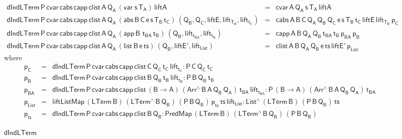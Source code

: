 \documentclass[sigplan,10pt]{acmart}
\begin{document}
\begin{figure*}[t]
\begin{adjustbox}{varwidth=7.3in, max width=7.1in, margin=-0.0in 0in
      -0.2in 0in, fbox, center}
{\small
\[\begin{array}{lll}
\mathsf{dIndLTerm \, P\, cvar \, cabs\, capp\, clist \, A\, Q_A\,
  (var\;s\,T_A) \, liftA} & = & \mathsf{cvar \, A\, Q_A\, s\, T_A\,
  liftA}\\ 
\mathsf{dIndLTerm \, P\, cvar \, cabs\, capp\, clist \, A\, Q_A\,
  (abs \,B \,C \,e \,s \,T_B \, t_C) \, (Q_B , Q_C , liftE,
  lift_{T_B}, lift_{t_C})} & = & \mathsf{cabs\,A\,B\,C\, Q_A\,
  Q_B\, Q_C\, e\, s\, T_B\, t_C\, liftE\, lift_{T_B}\, p_C}\\
\mathsf{dIndLTerm \, P\, cvar \, cabs\, capp\, clist \, A\, Q_A\,
    (app \,B \,\,t_{BA} \, t_B)\, (Q_B , lift_{t_{BA}}, lift_{t_B})} &
= & \mathsf{capp\,A\,B\,Q_A\, Q_B\, t_{BA}\, t_B\, p_{BA} \, p_B}\\
  \mathsf{dIndLTerm \, P\, cvar \, cabs\, capp\, clist \, A\, Q_A\,
    (list \,B \,e \, ts) \, (Q_B , liftE', lift_{List})} & = & 
  \mathsf{clist \,A\,B\,Q_A\, Q_B\, e\, ts\, liftE'\, p_{List} }
\end{array}\]}
\mbox{where}
{\small
\[\begin{array}{lll}
\mathsf{p_C} & = & \mathsf{dIndLTerm\,P\,cvar\,cabs \,capp \,clist\,
  C\, Q_C\, t_C\, lift_{t_C} : P \, C\, Q_C \, t_C }\\
\mathsf{p_B} & = & \mathsf{dIndLTerm\,P\,cvar\,cabs \,capp \,clist\,
  B\, Q_B\, t_B\, lift_{t_B} : P \, B\, Q_B \, t_B }\\
\mathsf{p_{BA}} & = & \mathsf{dIndLTerm\,P\,cvar\,cabs \,capp
  \,clist\, (B \to A)\,(Arr^{\wedge} \, B\, A\, Q_B \, Q_A) \,
  t_{BA}\, lift_{t_{BA}} : P \, (B \to A)\, (Arr^{\wedge} \, B\, A\,
  Q_B \, Q_A) \, t_{BA}}\\ 
\mathsf{p_{List}} & = &\mathsf{liftListMap \, (LTerm\, B) \,
  (LTerm^{\wedge} \, B \, Q_B)\, (P\,B\,Q_B)\, p_{ts} \, ts\,
  lift_{List} : List^{\wedge}\, (LTerm\,B) \, (P\,B\,Q_B) \, ts}\\
\mathsf{p_{ts}} & = & \mathsf{dIndLTerm\, P\, cvar\, cabs\, capp\,
  clist\, B\, Q_B : PredMap\,(LTerm\,B) \,(LTerm^{\wedge}\, B\, Q_B)
  \, (P\,B\,Q_B)}
\end{array}\]}

\vspace*{-0.1in}

\caption{$\mathsf{dIndLTerm}$}\label{fig:dindlterm} \vspace*{0.1in} 
\end{adjustbox}
\end{figure*}
\end{document}
